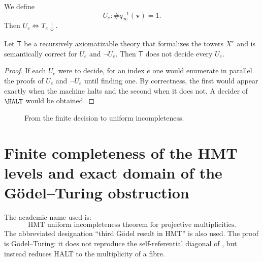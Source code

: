 We define
\[
  U_e:\#q_\infty^{-1}(\boldsymbol v)=1.
\]
Then \(U_e\iff T_e\downarrow\).

\begin{theorem}
\label{p3-83-c46-s1:thm:uniform-incompleteness}
Let \(\mathsf T\) be a recursively axiomatizable theory that formalizes the
towers \(X^e\) and is semantically correct for \(U_e\) and
\(\neg U_e\). Then \(\mathsf T\) does not decide every \(U_e\).
\end{theorem}

\begin{proof}
If each \(U_e\) were to decide, for an index \(e\) one would enumerate in parallel
the proofs of \(U_e\) and \(\neg U_e\) until finding one. By correctness,
the first would appear exactly when the machine halts and the second
when it does not. A decider of \(\HALT\) would be obtained.
\end{proof}

\begin{figure}[H]
\centering
{}
\caption{From the finite decision to uniform incompleteness.}
\label{p3-83-c46-s1:fig:godel-turing}
\end{figure}

\section{Finite completeness of the HMT levels and exact domain of the Gödel--Turing obstruction}

The academic name used is:
\[
\boxed{\text{HMT uniform incompleteness theorem for projective multiplicities}.}
\]
The abbreviated designation “third Gödel result in HMT” is also used. The proof
is Gödel--Turing: it does not reproduce the self-referential diagonal of
\cite{goedel1931}, but instead reduces HALT to the multiplicity of a fibre.

